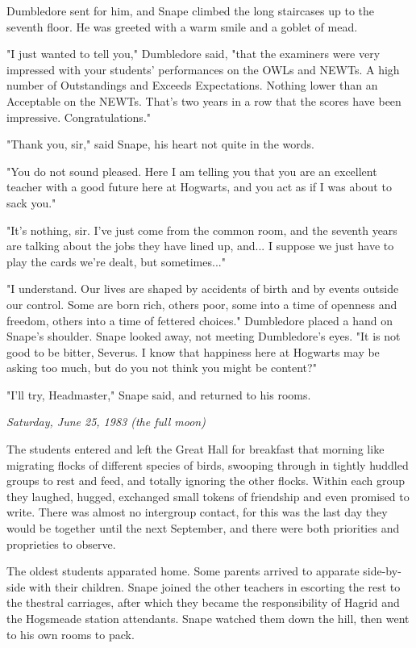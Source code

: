 \documentclass[a4paper,11pt]{article}
\begin{document}
Dumbledore sent for him, and Snape climbed the long staircases up to the seventh floor. He was greeted with a warm smile and a goblet of mead.

"I just wanted to tell you," Dumbledore said, "that the examiners were very impressed with your students' performances on the OWLs and NEWTs. A high number of Outstandings and Exceeds Expectations. Nothing lower than an Acceptable on the NEWTs. That's two years in a row that the scores have been impressive. Congratulations."

"Thank you, sir," said Snape, his heart not quite in the words.

"You do not sound pleased. Here I am telling you that you are an excellent teacher with a good future here at Hogwarts, and you act as if I was about to sack you."

"It's nothing, sir. I've just come from the common room, and the seventh years are talking about the jobs they have lined up, and... I suppose we just have to play the cards we're dealt, but sometimes..."

"I understand. Our lives are shaped by accidents of birth and by events outside our control. Some are born rich, others poor, some into a time of openness and freedom, others into a time of fettered choices." Dumbledore placed a hand on Snape's shoulder. Snape looked away, not meeting Dumbledore's eyes. "It is not good to be bitter, Severus. I know that happiness here at Hogwarts may be asking too much, but do you not think you might be content?"

"I'll try, Headmaster," Snape said, and returned to his rooms.

\emph{Saturday, June 25, 1983 (the full moon)}

The students entered and left the Great Hall for breakfast that morning like migrating flocks of different species of birds, swooping through in tightly huddled groups to rest and feed, and totally ignoring the other flocks. Within each group they laughed, hugged, exchanged small tokens of friendship and even promised to write. There was almost no intergroup contact, for this was the last day they would be together until the next September, and there were both priorities and proprieties to observe.

The oldest students apparated home. Some parents arrived to apparate side-by-side with their children. Snape joined the other teachers in escorting the rest to the thestral carriages, after which they became the responsibility of Hagrid and the Hogsmeade station attendants. Snape watched them down the hill, then went to his own rooms to pack.
\end{document}
